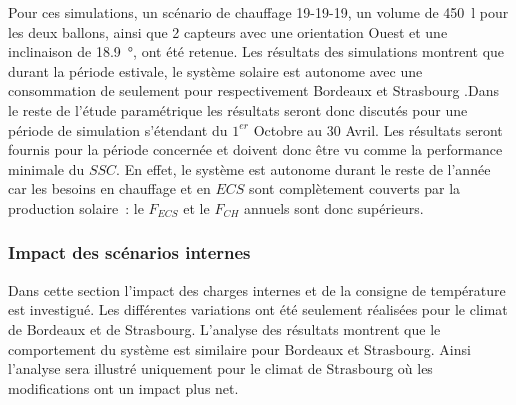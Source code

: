 Pour ces simulations, un scénario de chauffage 19-19-19, un volume de \SI{450}{\litre}
pour les deux ballons, ainsi que \num{2} capteurs avec une orientation Ouest et une
inclinaison de \SI{18.9}{\degree}, ont été retenue. Les résultats des simulations montrent
que durant la période estivale, le système solaire est autonome avec une consommation de
seulement  pour respectivement Bordeaux et
Strasbourg %
.Dans le reste de l’étude paramétrique les résultats seront donc discutés pour une période
de simulation s’étendant du $1^{er}$ Octobre au $30$ Avril. Les résultats seront fournis
pour la période concernée et doivent donc être vu comme la performance minimale du $SSC$.
En effet, le système est autonome durant le reste de l’année car les besoins en chauffage
et en $ECS$ sont complètement couverts par la production solaire~: le $F_{ECS}$ et le
$F_{CH}$ annuels sont donc supérieurs.




\subsubsection{Impact des scénarios internes} %
\label{ssub:impact_des_scenarios_internes}
Dans cette section l’impact des charges internes et de la consigne de température est
investigué. Les différentes variations ont été seulement réalisées pour le climat
de Bordeaux et de Strasbourg. L’analyse des résultats montrent que le comportement
du système est similaire pour Bordeaux et Strasbourg. Ainsi l’analyse sera illustré
uniquement pour le climat de Strasbourg où les modifications ont un impact plus net.

